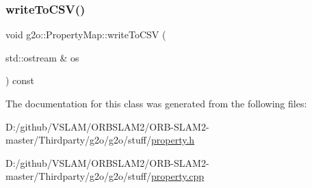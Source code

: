 \subsubsection{\texorpdfstring{write\+To\+C\+S\+V()}{writeToCSV()}}
{\footnotesize\ttfamily void g2o\+::\+Property\+Map\+::write\+To\+C\+SV (\begin{DoxyParamCaption}\item[{std\+::ostream \&}]{os }\end{DoxyParamCaption}) const}



The documentation for this class was generated from the following files\+:\begin{DoxyCompactItemize}
\item 
D\+:/github/\+V\+S\+L\+A\+M/\+O\+R\+B\+S\+L\+A\+M2/\+O\+R\+B-\/\+S\+L\+A\+M2-\/master/\+Thirdparty/g2o/g2o/stuff/\mbox{\hyperlink{property_8h}{property.\+h}}\item 
D\+:/github/\+V\+S\+L\+A\+M/\+O\+R\+B\+S\+L\+A\+M2/\+O\+R\+B-\/\+S\+L\+A\+M2-\/master/\+Thirdparty/g2o/g2o/stuff/\mbox{\hyperlink{property_8cpp}{property.\+cpp}}\end{DoxyCompactItemize}
